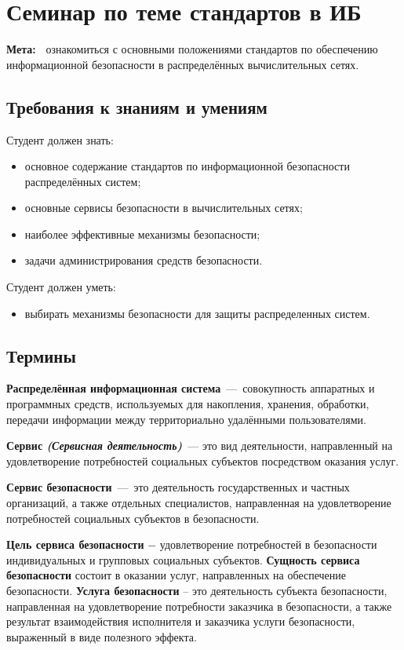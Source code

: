 \chapter{Семинар по теме стандартов в ИБ} \label{chapt5}%
\textbf{Мета:~}%
ознакомиться с основными положениями стандартов по обеспечению информационной
безопасности в распределённых вычислительных сетях.
\section{Требования к знаниям и умениям} \label{sect4_a}
%
\noindent Студент должен знать:
\begin{itemize}
  \item основное содержание стандартов по информационной безопасности
      распределённых систем;
  \item основные сервисы безопасности в вычислительных сетях;
  \item наиболее эффективные механизмы безопасности;
  \item задачи администрирования средств безопасности.
\end{itemize}

\noindent Студент должен уметь:
\begin{itemize}
  \item выбирать механизмы безопасности для защиты распределенных систем.
\end{itemize}

\section{Термины}
\textbf{Распределённая информационная система}~---~совокупность аппаратных и
программных средств, используемых для накопления, хранения, обработки,
передачи информации между территориально удалёнными пользователями.

\textbf{Сервис \emph{(Сервисная деятельность)}}~--- это вид деятельности,
направленный на удовлетворение потребностей социальных субъектов посредством
оказания услуг.



 \textbf{Сервис безопасности}~---~это деятельность государственных
и частных организаций, а также отдельных специалистов, направленная на
удовлетворение потребностей социальных субъектов в безопасности.

\textbf{Цель сервиса безопасности} − удовлетворение потребностей в
безопасности индивидуальных и групповых социальных субъектов.
\textbf{Сущность сервиса безопасности} состоит в оказании услуг, направленных
на обеспечение безопасности. \textbf{Услуга безопасности} – это деятельность
субъекта безопасности, направленная на удовлетворение потребности заказчика в
безопасности, а также результат взаимодействия исполнителя и заказчика услуги
безопасности, выраженный в виде полезного эффекта.

